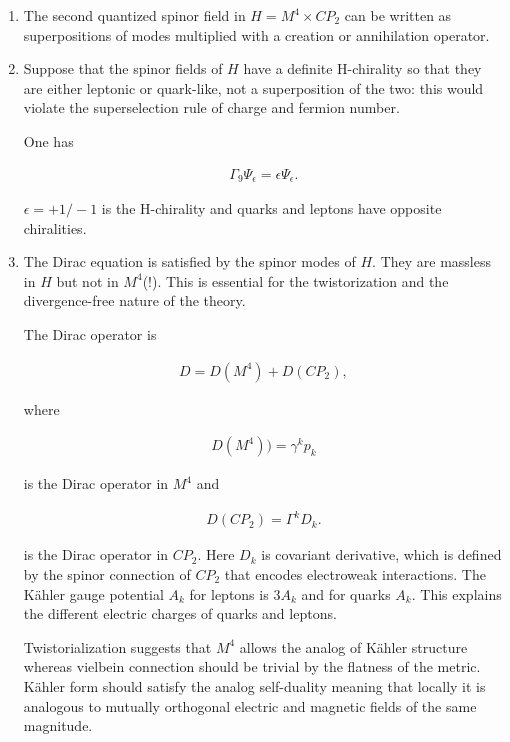 \documentclass[10pt,epsf]{article}
\begin{document}
\begin{enumerate}

\item The second quantized spinor field in $H=M^4\times CP_2$    can be written as superpositions of modes multiplied with a creation or annihilation operator.

\item Suppose that the spinor fields of $H$ have a definite H-chirality so that they are either leptonic or quark-like, not a superposition of the two: this would violate the superselection rule of charge and fermion number.

One has

\begin{eqnarray}
\Gamma_9\Psi_{\epsilon} = \epsilon \Psi_{\epsilon} .
\end{eqnarray}

\noindent $\epsilon =+1/-1$ is the H-chirality and quarks and leptons have opposite chiralities.

\item The Dirac equation is satisfied by the spinor modes of $H$. They  are massless in $H$ but not in $M^4$(!). This is essential for the  twistorization and the divergence-free nature of the theory.

The Dirac operator is

\begin{eqnarray}
D= D(M^4)+ D(CP_2), 
\end{eqnarray}

\noindent   where 

\begin{eqnarray}
D(M^4))=\gamma^kp_k 
\end{eqnarray}


\noindent is the Dirac operator in $M^4$ and 

\begin{eqnarray}
D(CP_2)=\Gamma^kD_k .
\end{eqnarray}


\noindent is the Dirac operator in $CP_2$.   Here $D_k$ is covariant derivative, which is defined by the spinor connection of $CP_2$ that encodes electroweak interactions. The K\"ahler gauge potential $A_k$ for leptons is $3A_k$ and for quarks $A_k$. This explains the different electric charges of quarks and leptons.

Twistorialization suggests that   $M^4$ allows the analog of K\"ahler structure whereas vielbein connection should be trivial by the flatness of the metric. K\"ahler form should satisfy the analog  self-duality meaning that locally it is analogous to  mutually orthogonal electric and magnetic fields of  the same magnitude. 



\end{enumerate}
\end{document}
